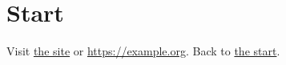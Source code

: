 \documentclass{article}
\begin{document}
\section{Start}\label{sec:start}
Visit \href{https://example.com/a_b#x}{the site} or \url{https://example.org}.
Back to \hyperref[sec:start]{the start}.
\end{document}
